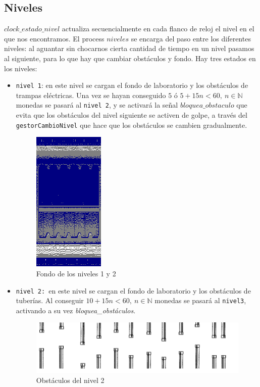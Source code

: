 \documentclass[11pt, a4paper, spanish, openright, twoside]{book}
\begin{document}
\subsection{Niveles}

$clock\_estado\_nivel$ actualiza secuencialmente en cada flanco de reloj el nivel en el que nos encontramos.
El process $niveles$ se encarga del paso entre los diferentes niveles: al aguantar sin chocarnos cierta cantidad de tiempo en un nivel pasamos al siguiente, para lo que hay que cambiar obstáculos y fondo.
Hay tres estados en los niveles:
\begin{itemize}
\item \texttt{nivel 1}: en este nivel se cargan el fondo de laboratorio y los obstáculos de trampas eléctricas. Una vez se hayan conseguido $5$ ó  $5+15n<60,\ n\in\mathbb{N}$  monedas se pasará al \texttt{nivel 2}, y se activará la señal $bloquea\_obstaculo$ que evita que los obstáculos del nivel siguiente se activen de golpe, a través del \texttt{gestorCambioNivel} que hace que los obstáculos se cambien gradualmente. 

	\begin{figure}[!h]
		\centering
		\includegraphics[scale=0.8]{lab.png}
		\caption{Fondo de los niveles 1 y 2}
	\end{figure}

\item \texttt{nivel 2: }en este nivel se cargan el fondo de laboratorio y los obstáculos de tuberías. Al conseguir  $10+15n<60,\ n\in\mathbb{N}$ monedas se pasará al \texttt{nivel3}, activando a su vez \textit{bloquea\_obstáculos}.

	\begin{figure}[!h]
		\centering
		\includegraphics[scale=0.45]{flappy.png}
		\caption{Obstáculos del nivel 2}
	\end{figure}


\end{itemize}
\end{document}
